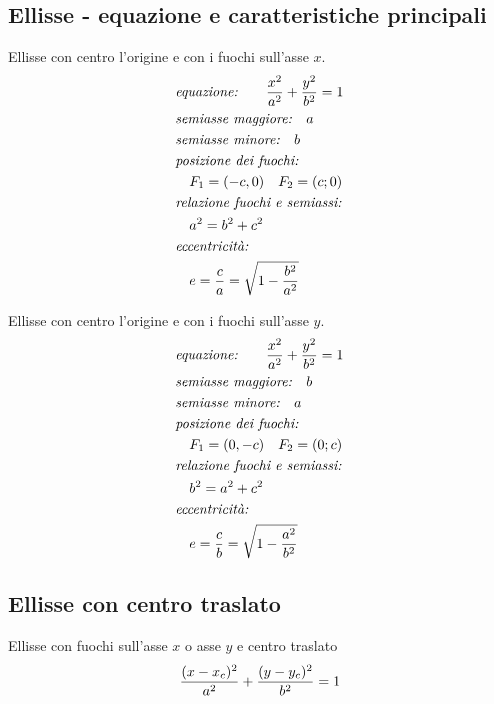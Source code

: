 \documentclass{article}
\begin{document}
  \subsection*{Ellisse - equazione e caratteristiche principali}
  \begin{minipage}[t]{.45\textwidth}
    Ellisse con centro l'origine e con i fuochi sull'asse $x$.
    \begin{align}
      & \text{\textit{equazione:}} \qquad
      \frac{x^2}{a^2} + \frac{y^2}{b^2} = 1 \\
      & \text{\textit{semiasse maggiore:}} \quad a \\
      & \text{\textit{semiasse minore:}} \quad b \\
      & \text{\textit{posizione dei fuochi:}} \nonumber \\
      & \quad F_1 = (-c, 0) \quad F_2 = (c; 0) \\
      & \text{\textit{relazione fuochi e semiassi:}} \nonumber \\
      & \quad a^2 = b^2 + c^2 \\
      & \text{\textit{eccentricità:}} \nonumber \\
      & \quad e = \frac{c}{a} = \sqrt{1-\frac{b^2}{a^2}}
    \end{align}
  \end{minipage}
  \hfill
  \begin{minipage}[t]{.45\textwidth}
    Ellisse con centro l'origine e con i fuochi sull'asse $y$.
    \begin{align}
      & \text{\textit{equazione:}} \qquad
      \frac{x^2}{a^2} + \frac{y^2}{b^2} = 1 \\
      & \text{\textit{semiasse maggiore:}} \quad b \\
      & \text{\textit{semiasse minore:}} \quad a \\
      & \text{\textit{posizione dei fuochi:}} \nonumber \\
      & \quad F_1 = (0, -c) \quad F_2 = (0; c) \\
      & \text{\textit{relazione fuochi e semiassi:}} \nonumber \\
      & \quad b^2 = a^2 + c^2 \\
      & \text{\textit{eccentricità:}} \nonumber \\
      & \quad e = \frac{c}{b} = \sqrt{1-\frac{a^2}{b^2}}
    \end{align}
  \end{minipage}

  \subsection*{Ellisse con centro traslato}
  Ellisse con fuochi sull'asse $x$ o asse $y$ e centro traslato
  \begin{equation}
    \frac{(x-x_c)^2}{a^2} + \frac{(y-y_c)^2}{b^2} = 1 \\
  \end{equation}
\end{document}
